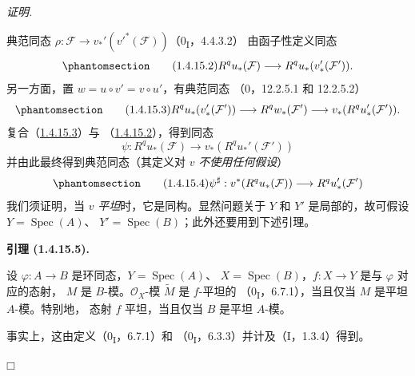 \documentclass[UTF8,fontset=none,11pt,oneside,openany]{ctexbook}
\providecommand{\square}{\mdlgwhtsquare}
\newenvironment{lemma}[1][]{%
  \par\medskip\noindent\textbf{引理 (#1).}\ %
}{\par}
\newenvironment{proof}{%
  \par\smallskip\noindent\textit{证明.}\ %
}{\hfill$\square$\par}
\newcommand{\oldpage}[2][]{%
  \hypertarget{ega-source-page-#1-#2}{}%
  \marginnote{\scriptsize\textbf{#1}~|~#2}\ignorespaces}
\let\EGAOriginalLabel\label
\renewcommand{\label}[1]{\phantomsection\EGAOriginalLabel{#1}}
\begin{document}
\oldpage[III]{93}
\begin{proof}
典范同态
$\rho:\mathcal F\to v_*'(v'^*(\mathcal F))$（0\textsubscript{I}，4.4.3.2）
由函子性定义同态
\begin{equation}
\label{III.1.4.15.2-fr}
\tag{1.4.15.2}
R^qu_*(\mathcal F)\longrightarrow R^qu_*(v_*'(\mathcal F')).
\end{equation}
另一方面，置 $w=u\circ v'=v\circ u'$，有典范同态
（0，12.2.5.1 和 12.2.5.2）
\begin{equation}
\label{III.1.4.15.3-fr}
\tag{1.4.15.3}
R^qu_*(v_*'(\mathcal F'))\longrightarrow R^qw_*(\mathcal F')
\longrightarrow v_*(R^qu_*'(\mathcal F')).
\end{equation}
复合（\hyperref[III.1.4.15.3-fr]{1.4.15.3}）与
（\hyperref[III.1.4.15.2-fr]{1.4.15.2}），得到同态
\[
\psi:R^qu_*(\mathcal F)\longrightarrow v_*(R^qu_*'(\mathcal F'))
\]
并由此最终得到典范同态（其定义对 $v$ \emph{不使用任何假设}）
\begin{equation}
\label{III.1.4.15.4-fr}
\tag{1.4.15.4}
\psi^\sharp:v^*(R^qu_*(\mathcal F))\longrightarrow R^qu_*'(\mathcal F')
\end{equation}
我们须证明，当 $v$ \emph{平坦}时，它是同构。显然问题关于 $Y$ 和
$Y'$ 是局部的，故可假设 $Y=\operatorname{Spec}(A)$、
$Y'=\operatorname{Spec}(B)$；此外还要用到下述引理。

\begin{lemma}[1.4.15.5]
\label{III.1.4.15.5-fr}
设 $\varphi:A\to B$ 是环同态，$Y=\operatorname{Spec}(A)$、
$X=\operatorname{Spec}(B)$，$f:X\to Y$ 是与 $\varphi$ 对应的态射，
$M$ 是 $B$-模。$\mathcal O_X$-模 $\widetilde M$ 是 $f$-平坦的
（0\textsubscript{I}，6.7.1），当且仅当 $M$ 是平坦 $A$-模。特别地，
态射 $f$ 平坦，当且仅当 $B$ 是平坦 $A$-模。
\end{lemma}

事实上，这由定义（0\textsubscript{I}，6.7.1）和
（0\textsubscript{I}，6.3.3）并计及（I，1.3.4）得到。


\end{proof}
\end{document}
